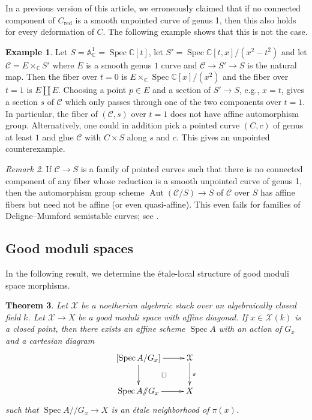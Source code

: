 \documentclass[a4paper]{amsart}
\theoremstyle{plain}
\newtheorem{theorem}{Theorem}[section]
\theoremstyle{definition}
\newtheorem{example}[theorem]{Example}
\theoremstyle{remark}
\newtheorem{remark}[theorem]{Remark}
\numberwithin{equation}{section}
\newcommand{\red}{\mathrm{red}}
\renewcommand\AA{\mathbb{A}}
\newcommand\CC{\mathbb{C}}
\newcommand\cC{\mathcal{C}}
\newcommand\cX{\mathcal{X}}
\DeclareMathOperator{\Spec}{Spec}
\newcommand{\gitq}{/\!\!/}
\DeclareMathOperator{\Aut}{Aut}
\begin{document}
In a previous version of this article, we erroneously claimed that if no
connected component of $C_{\red}$ is a smooth unpointed curve of genus 1, then
this also holds for every deformation of $C$. The following example shows that
this is not the case.

\begin{example}
Let $S=\AA^1_\CC=\Spec \CC[t]$, let $S'=\Spec \CC[t,x]/(x^2-t^2)$ and let
$\cC=E\times_\CC S'$ where $E$ is a smooth genus $1$ curve and $\cC\to S'\to S$
is the natural map. Then the fiber over $t=0$ is $E\times_\CC \Spec
\CC[x]/(x^2)$ and the fiber over $t=1$ is $E\amalg E$. Choosing a point
$p\in E$ and a section of $S'\to S$, e.g., $x=t$, gives a section $s$ of $\cC$
which only passes through one of the two components over $t=1$. In particular,
the fiber of $(\cC,s)$ over $t=1$ does not have affine automorphism
group. Alternatively, one could in addition pick a pointed curve $(C,c)$ of
genus at least $1$ and glue $\cC$ with $C\times S$ along $s$ and $c$. This
gives an unpointed counterexample.
\end{example}

\begin{remark}  If $\cC \to S$ is a family of pointed curves such that there is no connected component of any fiber whose reduction is a smooth unpointed curve of genus 1, then the automorphism group scheme $\Aut(\cC/S) \to S$ of $\cC$ over $S$ has affine fibers but need not be affine (or even quasi-affine).  This even fails for families of Deligne--Mumford semistable curves; see \cite[\S4.1]{alper-kresch}.
\end{remark}

\subsection{Good moduli spaces} \label{A:gms_app}
In the following result, we determine the \'etale-local structure of good moduli space morphisms. 
 \begin{theorem}  \label{T:consequences-gms} Let $\cX$ be a noetherian algebraic stack over an algebraically closed field $k$. Let $\cX \to X$ be a good moduli space with affine diagonal.
If $x\in \cX(k)$ is a
   closed point, then there exists an affine scheme $\Spec A$ with an action of $G_x$  and a cartesian diagram
   $$\xymatrix{
  	[\Spec A / G_x] \ar[r] \ar[d]				& \cX \ar[d]^{\pi} \\
	\Spec A \gitq G_x \ar[r]\ar@{}[ur]|\square	& X
  }$$ such that $\Spec A \gitq G_x \to X$ is an \'etale neighborhood of $\pi(x)$. 
\end{theorem}
\end{document}
